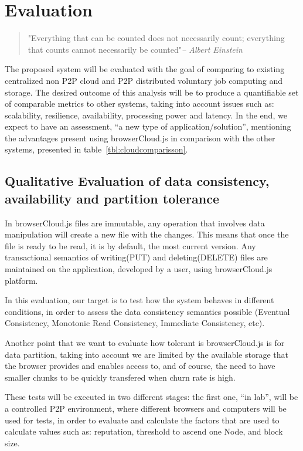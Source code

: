 \chapter{Evaluation}\label{ch:evaluation}

\begin{quotation}
  {\small\it }"Everything that can be counted does not necessarily count; everything that counts cannot necessarily be counted"{\small\it -- Albert Einstein }
\end{quotation}

The proposed system will be evaluated with the goal of comparing to existing centralized non P2P cloud and P2P distributed voluntary job computing and storage. The desired outcome of this analysis will be to produce a quantifiable set of comparable metrics to other systems, taking into account issues such as: scalability, resilience, availability, processing power and latency. In the end, we expect to have an assessment, ``a new type of application/solution'', mentioning the advantages present using browserCloud.js in comparison with the other systems, presented in table~\ref{tbl:cloudcomparisson}.


\section{Qualitative Evaluation of data consistency, availability and partition tolerance}

In browserCloud.js files are immutable, any operation that involves data manipulation will create a new file with the changes. This means that once the file is ready to be read, it is by default, the most current version. Any transactional semantics of writing(PUT) and deleting(DELETE) files are maintained on the application, developed by a user, using browserCloud.js platform. 

In this evaluation, our target is to test how the system behaves in different conditions, in order to assess the data consistency semantics possible (Eventual Consistency, Monotonic Read Consistency, Immediate Consistency, etc).

Another point that we want to evaluate how tolerant is browserCloud.js is for data partition, taking into account we are limited by the available storage that the browser provides and enables access to, and of course, the need to have smaller chunks to be quickly transfered when churn rate is high.

These tests will be executed in two different stages: the first one, ``in lab'', will be a controlled P2P environment, where different browsers and computers will be used for tests, in order to evaluate and calculate the factors that are used to calculate values such as: reputation, threshold to ascend one Node, and block size. 

